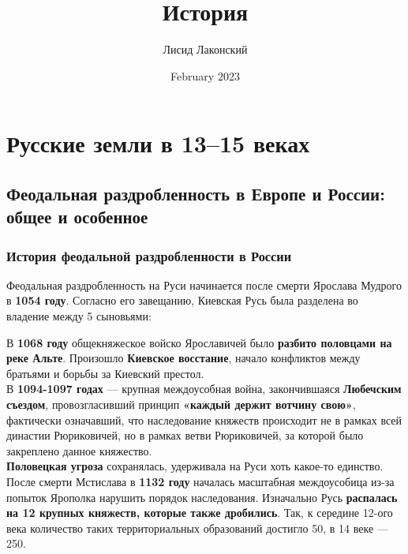\documentclass{article}
\title{История}
\author{Лисид Лаконский}
\date{February 2023}
\begin{document}
\raggedright

\maketitle
\tableofcontents
\pagebreak

\section{Русские земли в 13–15 веках}

\subsection{Феодальная раздробленность в Европе и России: общее и особенное}

\subsubsection{История феодальной раздробленности в России}

Феодальная раздробленность на Руси начинается после смерти Ярослава Мудрого в \textbf{1054 году}. Согласно его завещанию, Киевская Русь была разделена во владение между 5 сыновьями:

\begin{multienumerate}
\end{multienumerate}

В \textbf{1068 году} общекняжеское войско Ярославичей было \textbf{разбито половцами на реке Альте}. Произошло \textbf{Киевское восстание}, начало конфликтов между братьями и борьбы за Киевский престол. \\[1mm]

В \textbf{1094-1097 годах} — крупная междоусобная война, закончившаяся \textbf{Любечским съездом}, провозгласивший принцип \textbf{«каждый держит вотчину свою»}, фактически означавший, что наследование княжеств происходит не в рамках всей династии Рюриковичей, но в рамках ветви Рюриковичей, за которой было закреплено данное княжество. \\[1mm]

\textbf{Половецкая угроза} сохранялась, удерживала на Руси хоть какое-то единство. После смерти Мстислава в \textbf{1132 году} началась масштабная междоусобица из-за попыток Ярополка нарушить порядок наследования. Изначально Русь \textbf{распалась на 12 крупных княжеств, которые также дробились}. Так, к середине 12-ого века количество таких территориальных образований достигло 50, в 14 веке — 250. \\[1mm]
\end{document}
